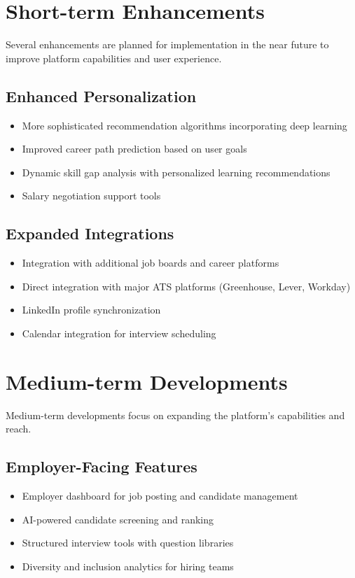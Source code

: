 \documentclass[12pt,a4paper]{report}
\begin{document}
\section{Short-term Enhancements}
Several enhancements are planned for implementation in the near future to improve platform capabilities and user experience.

\subsection{Enhanced Personalization}
\begin{itemize}[leftmargin=2em]
  \item More sophisticated recommendation algorithms incorporating deep learning
  \item Improved career path prediction based on user goals
  \item Dynamic skill gap analysis with personalized learning recommendations
  \item Salary negotiation support tools
\end{itemize}

\subsection{Expanded Integrations}
\begin{itemize}[leftmargin=2em]
  \item Integration with additional job boards and career platforms
  \item Direct integration with major ATS platforms (Greenhouse, Lever, Workday)
  \item LinkedIn profile synchronization
  \item Calendar integration for interview scheduling
\end{itemize}

\section{Medium-term Developments}
Medium-term developments focus on expanding the platform's capabilities and reach.

\subsection{Employer-Facing Features}
\begin{itemize}[leftmargin=2em]
  \item Employer dashboard for job posting and candidate management
  \item AI-powered candidate screening and ranking
  \item Structured interview tools with question libraries
  \item Diversity and inclusion analytics for hiring teams
\end{itemize}
\end{document}
